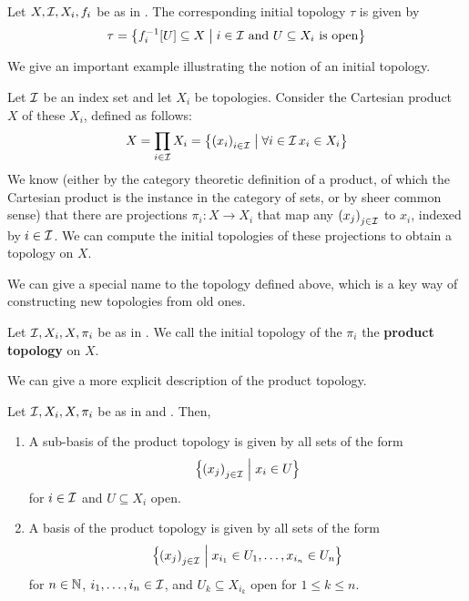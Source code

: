 \begin{boxlemma}
    Let $X, \mathcal{I}, X_i, f_i$ be as in . The corresponding initial topology $\tau$ is given by
    \begin{align*}
        \tau = \left\{ f_i^{-1}\!\left[ U \right] \subseteq X \; \middle\vert \; i \in \mathcal{I} \text{ and } U \subseteq X_i \text{ is open} \right\}
    \end{align*}
\end{boxlemma}

We give an important example illustrating the notion of an initial topology.

\begin{boxexample}[Products]\label{Ch1:Eg:Prod_Top_as_Init_Top}
    Let $\mathcal{I}$ be an index set and let $X_i$ be topologies. Consider the Cartesian product $X$ of these $X_i$, defined as follows:
    \begin{align*}
        X = \prod_{i \in \mathcal{I}} X_i = \left\{ \left( x_i \right)_{i \in \mathcal{I}} \; \middle\vert \; \forall i \in \mathcal{I}\, x_i \in X_i \right\}
    \end{align*}
    We know (either by the category theoretic definition of a product, of which the Cartesian product is the instance in the category of sets, or by sheer common sense) that there are projections $\pi_i : X \to X_i$ that map any $\left( x_j \right)_{j \in \mathcal{I}}$ to $x_i$, indexed by $i \in \mathcal{I}$. We can compute the initial topologies of these projections to obtain a topology on $X$.
\end{boxexample}

We can give a special name to the topology defined above, which is a key way of constructing new topologies from old ones.

\begin{boxdefinition}\label{Ch1:Def:Prod_Top}
    Let $\mathcal{I}, X_i, X, \pi_i$ be as in . We call the initial topology of the $\pi_i$ the \textbf{product topology} on $X$.
\end{boxdefinition}

We can give a more explicit description of the product topology.

\begin{boxproposition}
    Let $\mathcal{I}, X_i, X, \pi_i$ be as in  and . Then,
    \begin{enumerate}
        \item A sub-basis of the product topology is given by all sets of the form
        \begin{align*}
            \left\{ \left( x_j \right)_{j \in \mathcal{I}} \; \middle\vert \; x_i \in U \right\}
        \end{align*}
        for $i \in \mathcal{I}$ and $U \subseteq X_i$ open.

        \item A basis of the product topology is given by all sets of the form
        \begin{align*}
            \left\{ \left( x_j \right)_{j \in \mathcal{I}} \; \middle\vert \; x_{i_1} \in U_1, \ldots, x_{i_n} \in U_n \right\}
        \end{align*}
        for $n \in \mathbb{N}$, $i_1, \ldots, i_n \in \mathcal{I}$, and $U_k \subseteq X_{i_k}$ open for $1 \leq k \leq n$.
    \end{enumerate}
\end{boxproposition}


